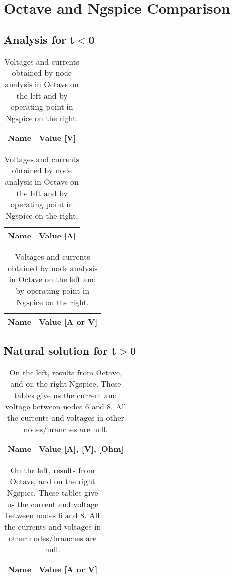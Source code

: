 \section{Octave and Ngspice Comparison}
\label{sec:comparision}

\subsection{Analysis for t$<$0}
\begin{table}[H]
	\centering
  \begin{tabular}{|l|r|}
    \hline    
    {\bf Name} & {\bf Value [V]} \\ \hline
	
  \end{tabular}
  \begin{tabular}{|l|r|}
    \hline    
    {\bf Name} & {\bf Value [A]} \\ \hline
	
  \end{tabular}
  \begin{tabular}{|l|r|}
    \hline    
    {\bf Name} & {\bf Value [A or V]} \\ \hline
    
  \end{tabular}
  \caption{Voltages and currents obtained by node analysis in Octave on the left and by operating point in Ngspice on the right.}
    \label{tab:comp1}
\end{table}

\subsection{Natural solution for t$>$0}
\begin{table}[H]
  \centering
  \begin{tabular}{|l|r|}
    \hline    
    {\bf Name} & {\bf Value [A], [V], [Ohm]} \\ \hline
	
  \end{tabular}
  \begin{tabular}{|l|r|}
    \hline    
    {\bf Name} & {\bf Value [A or V]} \\ \hline
    
  \end{tabular}
  \caption{On the left, results from Octave, and on the right Ngspice. These tables give us the current and voltage between nodes 6 and 8. All the currents and voltages in other nodes/branches are null.}
  \label{tab:comp2}
\end{table}
